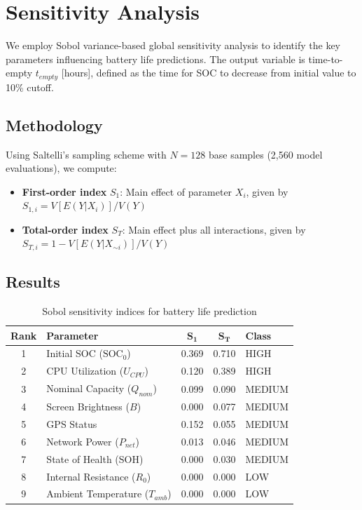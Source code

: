 \section{Sensitivity Analysis}
\label{sec:sensitivity}

We employ Sobol variance-based global sensitivity analysis to identify the key parameters influencing battery life predictions. The output variable is time-to-empty $t_{empty}$ [hours], defined as the time for SOC to decrease from initial value to 10\% cutoff.

\subsection{Methodology}

Using Saltelli's sampling scheme with $N=128$ base samples (2,560 model evaluations), we compute:
\begin{itemize}
    \item \textbf{First-order index} $S_1$: Main effect of parameter $X_i$, given by $S_{1,i} = V[E(Y|X_i)]/V(Y)$
    \item \textbf{Total-order index} $S_T$: Main effect plus all interactions, given by $S_{T,i} = 1 - V[E(Y|X_{\sim i})]/V(Y)$
\end{itemize}

\subsection{Results}

\begin{table}[H]
\centering
\caption{Sobol sensitivity indices for battery life prediction}
\label{tab:sobol_results}
\begin{tabular}{@{}clccl@{}}
\toprule
\textbf{Rank} & \textbf{Parameter} & $\mathbf{S_1}$ & $\mathbf{S_T}$ & \textbf{Class} \\
\midrule
1 & Initial SOC ($\text{SOC}_0$) & 0.369 & 0.710 & HIGH \\
2 & CPU Utilization ($U_{CPU}$) & 0.120 & 0.389 & HIGH \\
3 & Nominal Capacity ($Q_{nom}$) & 0.099 & 0.090 & MEDIUM \\
4 & Screen Brightness ($B$) & 0.000 & 0.077 & MEDIUM \\
5 & GPS Status & 0.152 & 0.055 & MEDIUM \\
6 & Network Power ($P_{net}$) & 0.013 & 0.046 & MEDIUM \\
7 & State of Health (SOH) & 0.000 & 0.030 & MEDIUM \\
8 & Internal Resistance ($R_0$) & 0.000 & 0.000 & LOW \\
9 & Ambient Temperature ($T_{amb}$) & 0.000 & 0.000 & LOW \\
\bottomrule
\end{tabular}
\end{table}

